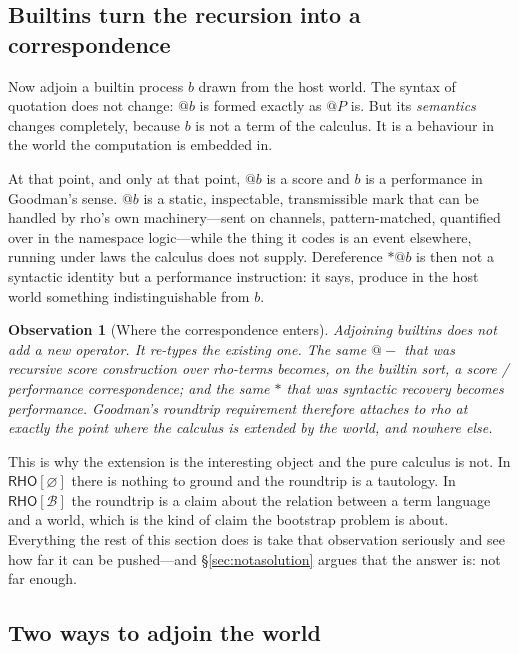 \documentclass[11pt,a4paper]{article}
\makeatletter
\theoremstyle{definition}
\theoremstyle{plain}
\newtheorem{observation}[definition]{Observation}
\theoremstyle{remark}
\newcommand{\rc}{\textup{rho}}
\newcommand{\RHO}{\mathsf{RHO}}
\newcommand{\Bee}{\mathcal{B}}
\newcommand{\quo}[1]{@#1}
\makeatother
\begin{document}
\subsection{Builtins turn the recursion into a correspondence}
\label{sec:turn}

Now adjoin a builtin process $b$ drawn from the host world. The syntax of quotation does
not change: $\quo{b}$ is formed exactly as $\quo{P}$ is. But its \emph{semantics} changes
completely, because $b$ is not a term of the calculus. It is a behaviour in the world the
computation is embedded in.

At that point, and only at that point, $\quo{b}$ is a score and $b$ is a performance in
Goodman's sense. $\quo{b}$ is a static, inspectable, transmissible mark that can be handled
by \rc{}'s own machinery---sent on channels, pattern-matched, quantified over in the
namespace logic---while the thing it codes is an event elsewhere, running under laws the
calculus does not supply. Dereference $*\quo{b}$ is then not a syntactic identity but a
performance instruction: it says, produce in the host world something indistinguishable
from $b$.

\begin{observation}[Where the correspondence enters]
\label{obs:enters}
Adjoining builtins does not add a new operator. It re-types the existing one. The same
$\quo{-}$ that was recursive score construction over \rc{}-terms becomes, on the builtin
sort, a score / performance correspondence; and the same $*$ that was syntactic recovery
becomes performance. Goodman's roundtrip requirement therefore attaches to \rc{} at exactly
the point where the calculus is extended by the world, and nowhere else.
\end{observation}

\noindent This is why the extension is the interesting object and the pure calculus is not.
In $\RHO[\varnothing]$ there is nothing to ground and the roundtrip is a tautology. In
$\RHO[\Bee]$ the roundtrip is a claim about the relation between a term language and a
world, which is the kind of claim the bootstrap problem is about. Everything the rest of
this section does is take that observation seriously and see how far it can be pushed---and
\S\ref{sec:notasolution} argues that the answer is: not far enough.

\subsection{Two ways to adjoin the world}
\end{document}
